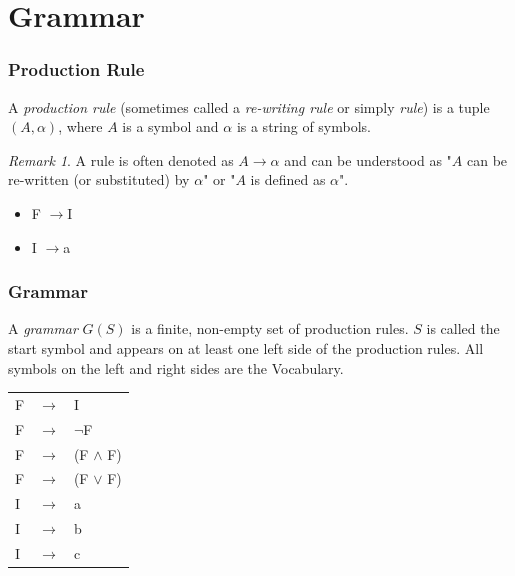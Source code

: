 \documentclass{beamer}
\theoremstyle{remark}
\newtheorem{remark}[theorem]{Remark}
\newenvironment{grammar}
	{\begin{tabular}[b]{lcl}}
	{\end{tabular}}
\newcommand{\rewritten}{$\to$}
\begin{document}
\section{Grammar}
\begin{frame}
	\frametitle{Production Rule}

	\begin{definition}
		A {\em production rule} (sometimes called a {\em re-writing rule} or simply {\em rule}) is a tuple
		$(A, \alpha)$, where $A$ is a symbol and $\alpha$ is a string of symbols.
	\end{definition}
	
	\pause
	
	\begin{remark}
	A rule is often denoted as $A \to \alpha$ and can be understood as "$A$ can be re-written (or substituted)
	by $\alpha$" or "$A$ is defined as $\alpha$".
	\end{remark}
	
	\begin{example}
		\begin{itemize}
			\item F \rewritten I
			\item I \rewritten a
		\end{itemize}
	\end{example}
\end{frame}

\begin{frame}
	\frametitle{Grammar}
	\begin{definition}
		A {\em grammar} $G(S)$ is a finite, non-empty set of production rules. $S$ is called the start
		symbol and appears on at least one left side of the production rules. All symbols on the left and
		right sides are the Vocabulary.
	\end{definition}
	
	\pause
	
	\begin{example}
		\begin{grammar}
			F & \rewritten & I \\
			F & \rewritten & $\lnot$F  \\
			F & \rewritten & (F $\land$ F)  \\
			F & \rewritten & (F $\lor$ F) \\
			I & \rewritten & a \\
			I & \rewritten & b \\
			I & \rewritten & c
		\end{grammar}
	\end{example}
\end{frame}
\end{document}
